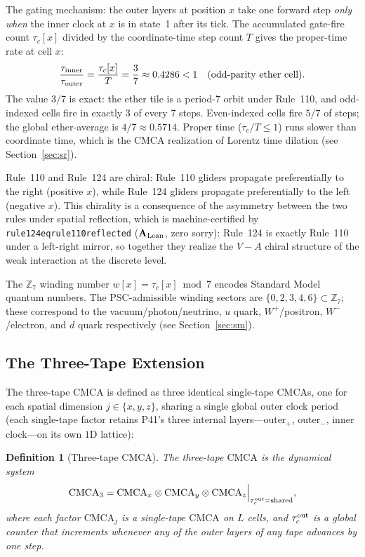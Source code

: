 \documentclass[11pt]{article}
\newtheorem{definition}[theorem]{Definition}
\theoremstyle{remark}
\newcommand{\ZS}{\mathbb{Z}_7}
\newcommand{\lean}[1]{%
  \penalty-100
  \begingroup\def\_{\textunderscore\allowbreak}\texttt{#1}\endgroup}
\newcommand{\CatAL}{\ensuremath{\textbf{A}_{\rm Lean}}}
\newcommand{\CMCA}{\text{CMCA}}
\newcommand{\tauc}{\tau_c}
\newcommand{\taucout}{\tau_c^{\rm out}}
\begin{document}
The gating mechanism: the outer layers at position $x$ take one forward step
\emph{only when} the inner clock at $x$ is in state~1 after its tick.
The accumulated gate-fire count $\tauc[x]$ divided by the coordinate-time
step count $T$ gives the proper-time rate at cell $x$:
\begin{equation}
  \frac{\tau_{\rm inner}}{\tau_{\rm outer}}
  = \frac{\tauc[x]}{T}
  = \frac{3}{7} \approx 0.4286 < 1
  \quad\text{(odd-parity ether cell).}
  \label{eq:clock-ratio}
\end{equation}
The value $3/7$ is exact: the ether tile is a period-$7$ orbit under Rule~110,
and odd-indexed cells fire in exactly $3$ of every $7$ steps.  Even-indexed
cells fire $5/7$ of steps; the global ether-average is $4/7 \approx 0.5714$.
Proper time ($\tauc / T \le 1$) runs slower than coordinate time, which is the
$\CMCA$ realization of Lorentz time dilation (see Section~\ref{sec:sr}).

Rule~110 and Rule~124 are chiral: Rule~110 gliders propagate preferentially to
the right (positive $x$), while Rule~124 gliders propagate preferentially to
the left (negative $x$). This chirality is a consequence of the asymmetry
between the two rules under spatial reflection, which is machine-certified by
\lean{rule124\_eq\_rule110\_reflected} ($\CatAL$, zero sorry):
Rule~124 is exactly Rule~110 under a left-right mirror, so together they
realize the $V{-}A$ chiral structure of the weak interaction at the discrete
level.

The $\ZS$ winding number $w[x] = \tauc[x] \bmod 7$ encodes Standard Model
quantum numbers. The PSC-admissible winding sectors are
$\{0, 2, 3, 4, 6\} \subset \ZS$; these correspond to the vacuum/photon/neutrino,
$u$ quark, $W^+$/positron, $W^-$/electron, and $d$ quark respectively
(see Section~\ref{sec:sm}).

\subsection{The Three-Tape Extension}

The three-tape $\CMCA$ is defined as three identical single-tape $\CMCA$s,
one for each spatial dimension $j \in \{x,y,z\}$, sharing a single global
outer clock period (each single-tape factor retains P41's three internal
layers---outer$_{+}$, outer$_{-}$, inner clock---on its own $1$D lattice):

\begin{definition}[Three-tape CMCA]
The \emph{three-tape $\CMCA$} is the dynamical system
\begin{equation}
  \mathrm{CMCA}_3 = \mathrm{CMCA}_x \otimes \mathrm{CMCA}_y \otimes
  \mathrm{CMCA}_z \Big|_{\taucout = \mathrm{shared}},
\end{equation}
where each factor $\mathrm{CMCA}_j$ is a single-tape $\CMCA$ on $L$ cells,
and $\taucout$ is a global counter that increments whenever any of the outer
layers of any tape advances by one step.
\end{definition}
\end{document}
